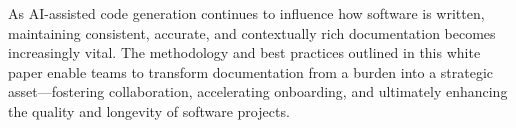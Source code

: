 \documentclass[12pt,oneside]{article}
\begin{document}
As AI-assisted code generation continues to influence how software is written, maintaining consistent, accurate, 
and contextually rich documentation becomes increasingly vital. The methodology and best practices outlined in 
this white paper enable teams to transform documentation from a burden into a strategic asset—fostering collaboration, 
accelerating onboarding, and ultimately enhancing the quality and longevity of software projects.


\printbibliography%
\end{document}
